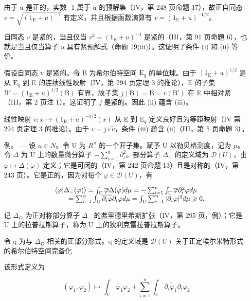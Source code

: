 由于 u 是正的，实数 -1 属于 u 的预解集（IV，第 248 页命题 17），故正自同态 \(v = \sqrt{(1_{\mathrm{E}} + u)^{-1}}\) 有定义，并且根据函数演算有 \(v = (1_{\mathrm{E}} + u)^{-1/2}\)。

自同态 \(v\) 是紧的，当且仅当 \(v^2 = (1_{\mathrm{E}} + u)^{-1}\) 是紧的（III，第 91 页命题 6），也就是当且仅当算子 \(u\) 具有紧预解式（命题 19(iii)）。这证明了条件 (i) 和 (ii) 等价。

假设自同态 \(v\) 是紧的。令 B 为希尔伯特空间 \(\mathrm{E}_q\) 的单位球。由于 \((1_{\mathrm{E}} + u)^{1/2}\) 是从 \(\mathrm{E}_q\) 到 E 的连续线性映射（IV，第 294 页定理 3 的推论），E 的子集 \(\mathrm{B}' = (1_{\mathrm{E}} + u)^{1/2}(\mathrm{B})\) 有界，故子集 \(j(\mathrm{B}) = \mathrm{B} = v(\mathrm{B}')\) 在 E 中相对紧（III，第 2 页注 1）。这证明了 \(j\) 是紧的。因此 (ii) 蕴含 (iii)。

线性映射 \(\widetilde{v}\colon x\mapsto(1_{\mathrm{E}}+u)^{-1/2}(x)\) 从 E 到 \(\mathrm{E}_{q}\) 定义良好且为等距映射（IV 第 294 页定理 3 的推论）。由于 \(v=j\circ\widetilde{v}\)，条件 (iii) 蕴含 (ii)（III，第 5 页命题 3）。

例。 --- 设 \(n \in N\)。令 U 为 \(R^{n}\) 的一个开子集。赋予 U 以勒贝格测度，记为 \(\mu\)。令 \(\Delta\) 为 U 上的数量微分算子 \(-\sum_{i=1}^{n}\partial_{i}^{2}\)。部分算子 \(\Delta_{-}\) 的定义域为 \(\mathcal{D}(U)\)，由 \(\varphi \mapsto \Delta(\varphi)\) 定义；它是可闭的（IV，第 242 页命题 13）且是对称的（IV，第 243 页）。它是正的，因为对每个 \(\varphi \in \mathcal{D}(U)\)，有

\[
\begin{array}{r l} & {\langle \varphi | \Delta_ {-} (\varphi) \rangle = \int_ {\mathrm{U}} \overline {{\varphi}} \Delta (\varphi) d \mu = - \sum_ {i = 1} ^ {n} \int_ {\mathrm{U}} \overline {{\varphi}} \partial_ {i} ^ {2} \varphi d \mu} \\ & {\qquad = \sum_ {i = 1} ^ {n} \int_ {\mathrm{U}} \overline {{\partial_ {i} \varphi}} \partial_ {i} \varphi d \mu = \int_ {\mathrm{U}} \sum_ {i = 1} ^ {n} | \partial_ {i} \varphi | ^ {2} d \mu \geqslant 0.} \end{array}
\]

记 \(\Delta_{D}\) 为正对称部分算子 \(\Delta_{-}\) 的弗里德里希斯扩张（IV，第 295 页，例）；它是 U 上的拉普拉斯算子，称为 U 上的狄利克雷拉普拉斯算子。

令 q 为与 \(\Delta_{D}\) 相关的正部分形式。q 的定义域是 \(\mathcal{D}(U)\) 关于正定埃尔米特形式的希尔伯特空间完备化

该形式定义为

\[
(\varphi_ {1}, \varphi_ {2}) \mapsto \int_ {\mathrm{U}} \overline {{\varphi}} _ {1} \varphi_ {2} + \sum_ {i = 1} ^ {n} \int_ {\mathrm{U}} \overline {{\partial_ {i} \varphi_ {1}}} \partial_ {i} \varphi_ {2}
\]

